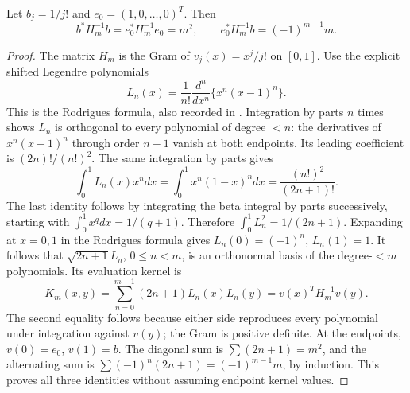 \begin{eglemma}\label{eg:lem:Legendre}
Let $b_j=1/j!$ and $e_0=(1,0,\ldots,0)^T$. Then
\[
 b^*H_m^{-1}b=e_0^*H_m^{-1}e_0=m^2,\qquad
                  e_0^*H_m^{-1}b=(-1)^{m-1}m.
 \tag{EG48}\label{eg:eq:Legendre-values}
\]
\end{eglemma}
\begin{proof}
The matrix $H_m$ is the Gram of $v_j(x)=x^j/j!$ on $[0,1]$.
Use the explicit shifted Legendre polynomials
\[
 L_n(x)=\frac1{n!}\frac{d^n}{dx^n}\{x^n(x-1)^n\}.
\]
This is the Rodrigues formula, also recorded in
\cite[\S18.5(ii)]{eg:DLMFLegendre}. Integration by parts $n$ times
shows $L_n$ is orthogonal to every polynomial of degree $<n$:
the derivatives of $x^n(x-1)^n$ through order $n-1$ vanish at both
endpoints. Its leading coefficient is $(2n)!/(n!)^2$.
The same integration by parts gives
\[
 \int_0^1 L_n(x)x^n dx=\int_0^1x^n(1-x)^n dx
                   =\frac{(n!)^2}{(2n+1)!}.
\]
The last identity follows by integrating the beta integral by parts
successively, starting with $\int_0^1x^qdx=1/(q+1)$.
Therefore $\int_0^1L_n^2=1/(2n+1)$. Expanding at $x=0,1$ in
the Rodrigues formula gives $L_n(0)=(-1)^n$, $L_n(1)=1$.
It follows that $\sqrt{2n+1}L_n$, $0\le n<m$, is an orthonormal
basis of the degree-$<m$ polynomials. Its evaluation kernel is
\[
 K_m(x,y)=\sum_{n=0}^{m-1}(2n+1)L_n(x)L_n(y)
                     =v(x)^T H_m^{-1}v(y).
\]
The second equality follows because either side reproduces every
polynomial under integration against $v(y)$; the Gram is positive
definite. At the endpoints, $v(0)=e_0$, $v(1)=b$. The diagonal sum
is $\sum(2n+1)=m^2$, and the alternating sum is
$\sum(-1)^n(2n+1)=(-1)^{m-1}m$, by induction. This proves all three
identities without assuming endpoint kernel values.
\end{proof}

